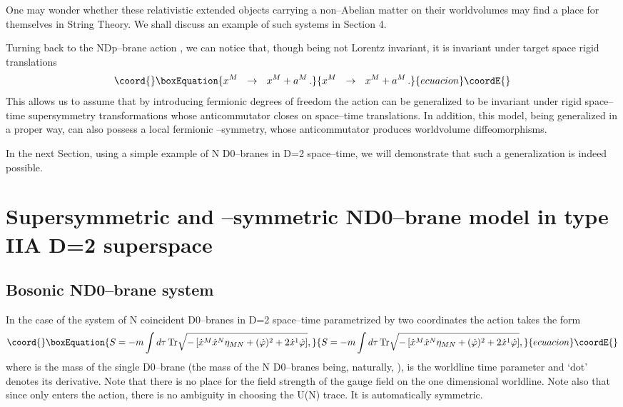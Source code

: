 \documentclass[a4paper,12pt]{article}
\begin{document}
One may wonder whether these relativistic extended objects carrying
a non--Abelian matter on their worldvolumes may
find a place for themselves in String Theory. We shall discuss an
example of such systems in Section 4.

Turning back to the NDp--brane action , we can notice that,
though being not Lorentz invariant, it is invariant under target
space rigid translations
\begin{equation}\coord{}\boxEquation{\label{10}
x^M~~\rightarrow~~x^M+a^M\,.
}{x^M~~\rightarrow~~x^M+a^M\,.
}{ecuacion}\coordE{}\end{equation}
This allows us to assume that by introducing fermionic degrees of
freedom the action  can be generalized to be invariant under
rigid space--time supersymmetry transformations whose
anticommutator closes on space--time translations. In addition,
this model, being generalized in a proper way, can also possess a
local fermionic \myHighlight{$\kappa$}\coordHE{}--symmetry, whose anticommutator produces
worldvolume diffeomorphisms.

In the next Section, using a simple example of N D0--branes in D=2
space--time, we will demonstrate that such a generalization is
indeed possible.

\section{Supersymmetric and \myHighlight{$\kappa$}\coordHE{}--symmetric ND0--brane model
in type IIA D=2 superspace}

\subsection{Bosonic ND0--brane system}
In the case of the system of N coincident D0--branes in D=2
space--time parametrized by two coordinates \coordHE{}  \coordHE{} the
action  takes the form
\begin{equation}\coord{}\boxEquation{\label{11}
S=- m \int d\tau\,{\rm Tr}
\sqrt{-\left[
\dot x^M\dot x^N\eta_{MN}+(\dot\varphi)^2 +
2\dot x^1 \dot\varphi\right]},
}{S=- m \int d\tau\,{\rm Tr}
\sqrt{-\left[
\dot x^M\dot x^N\eta_{MN}+(\dot\varphi)^2 +
2\dot x^1 \dot\varphi\right]},
}{ecuacion}\coordE{}\end{equation}
where \coordHE{} is the mass of the single D0--brane (the mass of the N
D0--branes being, naturally, \coordHE{}),
\myHighlight{$\tau$}\coordHE{} is the worldline time parameter and  `dot' denotes its
derivative. Note that there is no place for the field strength of
the gauge field
\coordHE{} on the one dimensional worldline. Note also that since
only
\myHighlight{$\dot\varphi$}\coordHE{} enters the action, there is no ambiguity in choosing
the U(N) trace. It is automatically symmetric.
\end{document}
